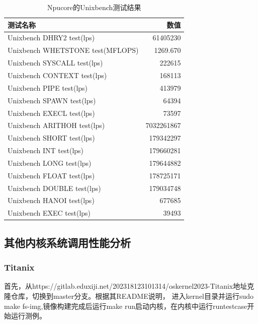 \begin{table}[H]
    \centering
    \begin{tabular}{|l|r|}
        \hline
        \textbf{测试名称} & \textbf{数值} \\
        \hline
        Unixbench DHRY2 test(lps) & 61405230 \\
        \hline
        Unixbench WHETSTONE test(MFLOPS) & 1269.670 \\
        \hline
        Unixbench SYSCALL test(lps) & 222615 \\
        \hline
        Unixbench CONTEXT test(lps) & 168113 \\
        \hline
        Unixbench PIPE test(lps) & 413979 \\
        \hline
        Unixbench SPAWN test(lps) & 64394 \\
        \hline
        Unixbench EXECL test(lps) & 73597 \\
        \hline
        Unixbench ARITHOH test(lps) & 7032261867 \\
        \hline
        Unixbench SHORT test(lps) & 179342297 \\
        \hline
        Unixbench INT test(lps) & 179660281 \\
        \hline
        Unixbench LONG test(lps) & 179644882 \\
        \hline
        Unixbench FLOAT test(lps) & 178725171 \\
        \hline
        Unixbench DOUBLE test(lps) & 179034748 \\
        \hline
        Unixbench HANOI test(lps) & 677685 \\
        \hline
        Unixbench EXEC test(lps) & 39493 \\
        \hline
    \end{tabular}
    \caption{Npucore的Unixbench测试结果}
    \label{Npucore的Unixbench测试结果}
\end{table}


\subsection{其他内核系统调用性能分析}


\subsubsection{Titanix}

首先，从https://gitlab.eduxiji.net/202318123101314/oskernel2023-Titanix地址克隆仓库，切换到master分支。根据其README说明，
进入kernel目录并运行sudo make fs-img,镜像构建完成后运行make run启动内核，在内核中运行runtestcase开始运行测例。

